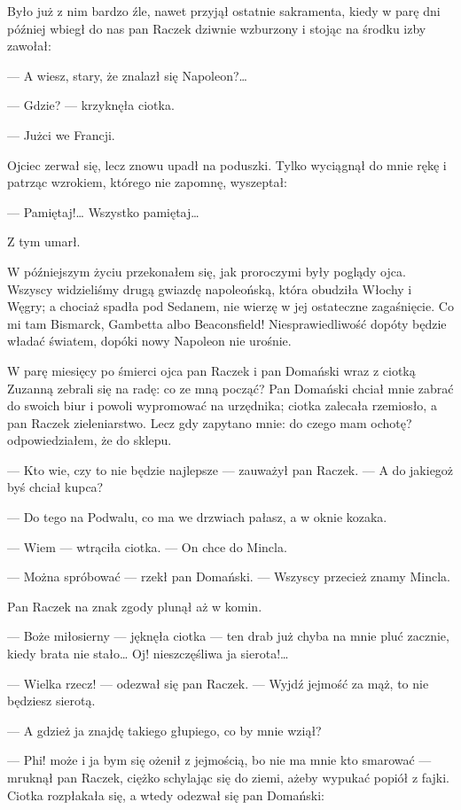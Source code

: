 \documentclass{book}
\begin{document}
Było już z nim bardzo źle, nawet przyjął ostatnie sakramenta, kiedy w parę dni później wbiegł do nas pan Raczek dziwnie wzburzony i stojąc na środku izby zawołał:

— A wiesz, stary, że znalazł się Napoleon?…

— Gdzie? — krzyknęła ciotka.

— Jużci we Francji.

Ojciec zerwał się, lecz znowu upadł na poduszki. Tylko wyciągnął do mnie rękę i patrząc wzrokiem, którego nie zapomnę, wyszeptał:

— Pamiętaj!… Wszystko pamiętaj…

Z tym umarł.

W późniejszym życiu przekonałem się, jak proroczymi były poglądy ojca. Wszyscy widzieliśmy drugą gwiazdę napoleońską, która obudziła Włochy i Węgry; a chociaż spadła pod Sedanem, nie wierzę w jej ostateczne zagaśnięcie. Co mi tam Bismarck, Gambetta albo Beaconsfield! Niesprawiedliwość dopóty będzie władać światem, dopóki nowy Napoleon nie urośnie.



W parę miesięcy po śmierci ojca pan Raczek i pan Domański wraz z ciotką Zuzanną zebrali się na radę: co ze mną począć? Pan Domański chciał mnie zabrać do swoich biur i powoli wypromować na urzędnika; ciotka zalecała rzemiosło, a pan Raczek zieleniarstwo. Lecz gdy zapytano mnie: do czego mam ochotę? odpowiedziałem, że do sklepu.

— Kto wie, czy to nie będzie najlepsze — zauważył pan Raczek. — A do jakiegoż byś chciał kupca?

— Do tego na Podwalu, co ma we drzwiach pałasz, a w oknie kozaka.

— Wiem — wtrąciła ciotka. — On chce do Mincla.

— Można spróbować — rzekł pan Domański. — Wszyscy przecież znamy Mincla.

Pan Raczek na znak zgody plunął aż w komin.

— Boże miłosierny — jęknęła ciotka — ten drab już chyba na mnie pluć zacznie, kiedy brata nie stało… Oj! nieszczęśliwa ja sierota!…

— Wielka rzecz! — odezwał się pan Raczek. — Wyjdź jejmość za mąż, to nie będziesz sierotą.

— A gdzież ja znajdę takiego głupiego, co by mnie wziął?

— Phi! może i ja bym się ożenił z jejmością, bo nie ma mnie kto smarować — mruknął pan Raczek, ciężko schylając się do ziemi, ażeby wypukać popiół z fajki. Ciotka rozpłakała się, a wtedy odezwał się pan Domański:
\end{document}
